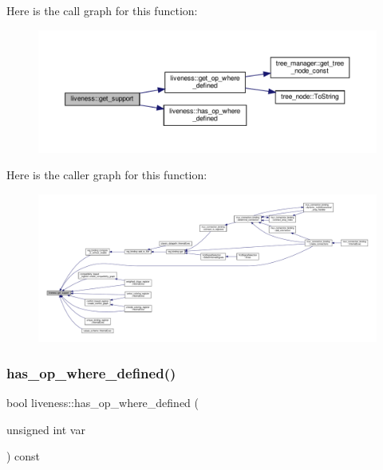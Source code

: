 Here is the call graph for this function\+:
\nopagebreak
\begin{figure}[H]
\begin{center}
\leavevmode
\includegraphics[width=350pt]{d3/d1f/classliveness_a6f96d3e472466ac40bf1ab8fdd59adc4_cgraph}
\end{center}
\end{figure}
Here is the caller graph for this function\+:
\nopagebreak
\begin{figure}[H]
\begin{center}
\leavevmode
\includegraphics[width=350pt]{d3/d1f/classliveness_a6f96d3e472466ac40bf1ab8fdd59adc4_icgraph}
\end{center}
\end{figure}
\mbox{\label{classliveness_ad19baefb1c0ef1ca086dd9db88e572aa}} 
\subsubsection{\texorpdfstring{has\+\_\+op\+\_\+where\+\_\+defined()}{has\_op\_where\_defined()}}
{\footnotesize\ttfamily bool liveness\+::has\+\_\+op\+\_\+where\+\_\+defined (\begin{DoxyParamCaption}\item[{unsigned int}]{var }\end{DoxyParamCaption}) const}



